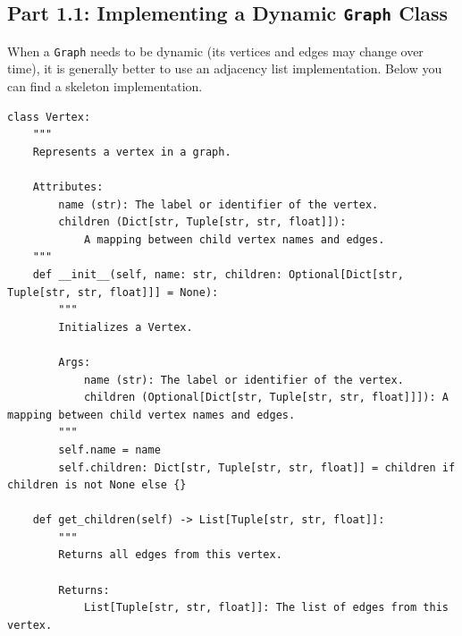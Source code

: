 \documentclass[12pt]{report}
\begin{document}
\setcounter{chapter}{1}
\MakeScribeTop

\setlength\parindent{0pt}

\subsection*{Part 1.1: Implementing a Dynamic \texttt{Graph} Class}
When a \texttt{Graph} needs to be dynamic (its vertices and edges may change over time), it is generally better to use an adjacency list implementation. Below you can find a skeleton implementation.
    \begin{lstlisting}[style=mypython]
class Vertex:
    """
    Represents a vertex in a graph.

    Attributes:
        name (str): The label or identifier of the vertex.
        children (Dict[str, Tuple[str, str, float]]): 
            A mapping between child vertex names and edges.
    """
    def __init__(self, name: str, children: Optional[Dict[str, Tuple[str, str, float]]] = None):
        """
        Initializes a Vertex.

        Args:
            name (str): The label or identifier of the vertex.
            children (Optional[Dict[str, Tuple[str, str, float]]]): A mapping between child vertex names and edges.
        """
        self.name = name
        self.children: Dict[str, Tuple[str, str, float]] = children if children is not None else {}

    def get_children(self) -> List[Tuple[str, str, float]]:
        """
        Returns all edges from this vertex.

        Returns:
            List[Tuple[str, str, float]]: The list of edges from this vertex.
\end{lstlisting}
\clearpage
\end{document}
